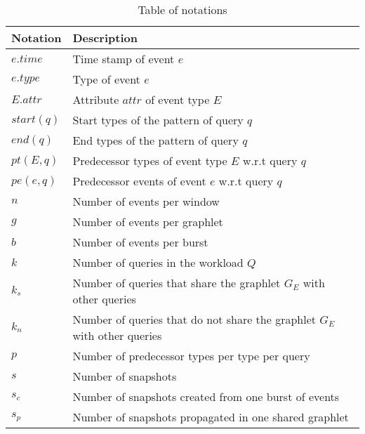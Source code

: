 \begin{table}[!tb]
    \centering
    \begin{tabular}{|p{1.3cm}|p{11.3cm}|}
    \hline
        Notation 
        & Description \\\hline\hline
       $e.\mathit{time}$
       & Time stamp of event $e$ \\\hline
       $e.\mathit{type}$
       & Type of event $e$ \\\hline
       $E.\mathit{attr}$
       & Attribute $\mathit{attr}$ of event type $E$ \\\hline
       $\mathit{start}(q)$
       & Start types of the pattern of query $q$ \\\hline
       $\mathit{end}(q)$
       & End types of the pattern of query $q$ \\\hline
       $\mathit{pt}(E,q)$
       & Predecessor types of event type $E$ w.r.t query $q$ \\\hline
       $\mathit{pe}(e,q)$
       & Predecessor events of event $e$ w.r.t query $q$  \\\hline
       $n$ & Number of events per window \\\hline
       $g$ & Number of events per graphlet \\\hline
       $b$ & Number of events per burst \\\hline
       $k$ & Number of queries in the workload $Q$ \\\hline
       $k_s$ & Number of queries that share the graphlet $G_E$ with other queries \\\hline
       $k_n$ & Number of queries that do not share the graphlet $G_E$ with other queries \\\hline
       $p$
       & Number of predecessor types per type per query \\\hline
       $s$ & Number of snapshots \\\hline
       $s_c$
       & Number of snapshots created from one burst of events \\\hline
       $s_p$
       & Number of snapshots propagated in one shared graphlet \\\hline
    \end{tabular}
    \caption{Table of notations}
    \label{tab:notation}
\end{table}
